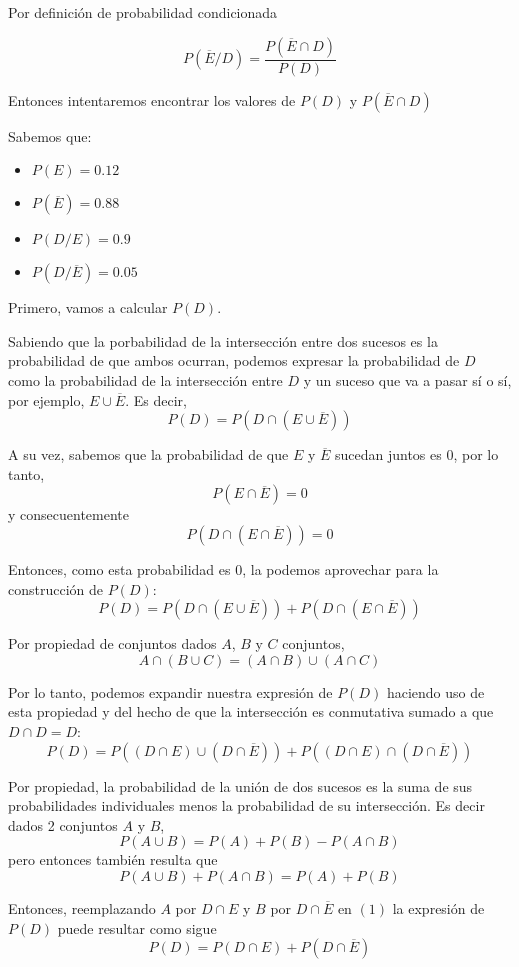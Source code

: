 \documentclass[11pt]{article}
\begin{document}
Por definici\'on de probabilidad condicionada

\[P(\overline{E}/D) = \frac{P(\overline{E}\cap D)}{P(D)}\]

Entonces intentaremos encontrar los valores de $P(D)$ y $P(\overline{E} \cap D)$

Sabemos que: 
\begin{itemize}
    \item $P(E) = 0.12$
    \item $P(\overline{E}) = 0.88$
    \item $P(D/E) = 0.9$
    \item $P(D/\overline{E}) = 0.05$
\end{itemize}

Primero, vamos a calcular $P(D)$.

Sabiendo que la porbabilidad de la intersecci\'on entre dos sucesos es la probabilidad de que ambos ocurran, podemos expresar la probabilidad de $D$ como la probabilidad de la intersección entre $D$ y un suceso que va a pasar s\'i o s\'i, por ejemplo, $E\cup \overline{E}$. Es decir,
\[P(D) = P(D \cap (E \cup \overline{E}))\]

A su vez, sabemos que la probabilidad de que $E$ y $\overline{E}$ sucedan juntos es $0$, por lo tanto, 
\[P(E\cap \overline{E}) = 0\] y consecuentemente \[P(D\cap (E \cap \overline{E})) = 0\] 

Entonces, como esta probabilidad es $0$, la podemos aprovechar para la construcci\'on de $P(D)$: 
\[P(D) = P(D \cap (E \cup \overline{E})) + P(D\cap (E \cap \overline{E}))\]

Por propiedad de conjuntos dados $A$, $B$ y $C$ conjuntos, 
\[A \cap (B\cup C) = (A\cap B) \cup (A\cap C)\]

Por lo tanto, podemos expandir nuestra expresi\'on de $P(D)$ haciendo uso de esta propiedad y del hecho de que la intersecci\'on es conmutativa sumado a que $D\cap D = D$: 
\[P(D) = P((D \cap E) \cup (D \cap \overline{E})) + P((D\cap E) \cap (D \cap \overline{E}))\]

Por propiedad, la probabilidad de la uni\'on de dos sucesos es la suma de sus probabilidades individuales menos la probabilidad de su intersecci\'on. Es decir dados 2 conjuntos $A$ y $B$, 
\[P(A\cup B)= P(A)+P(B)-P(A \cap B)\]
pero entonces tambi\'en resulta que 
\begin{equation}
P(A\cup B) + P(A\cap B) = P(A) + P(B)
\end{equation}

Entonces, reemplazando $A$ por $D\cap E$ y $B$ por $D\cap \overline{E}$ en $(1)$ la expresi\'on de $P(D)$ puede resultar como sigue
\[P(D) = P(D\cap E) + P(D\cap \overline{E})\]
\end{document}
